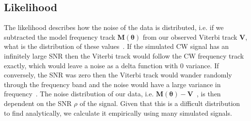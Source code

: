 %
%
\subsection{\label{par_est:bayes:likelihood}Likelihood}
%
%

The likelihood describes how the noise of the data is distributed, i.e. if we
subtracted the model frequency track $\bm{M}(\bm{\theta})$ from our observed
Viterbi track $\bm{V}$, what is the distribution of these values~. If the simulated \gls{CW} signal has an infinitely large \gls{SNR}
then the Viterbi track would follow the \gls{CW} frequency track exactly, which
would leave a noise as a delta function with 0 variance. If conversely, the \gls{SNR} was zero then the Viterbi track would
wander randomly through the frequency band and the noise would have a large
variance in frequency~. The noise distribution of our data, i.e. $\bm{M}(\bm{\theta}) -
\bm{V}$~, is then
dependent on the \gls{SNR} $\rho$ of the signal.  Given that this is a
difficult distribution to find analytically, we calculate it empirically using
many simulated signals.

